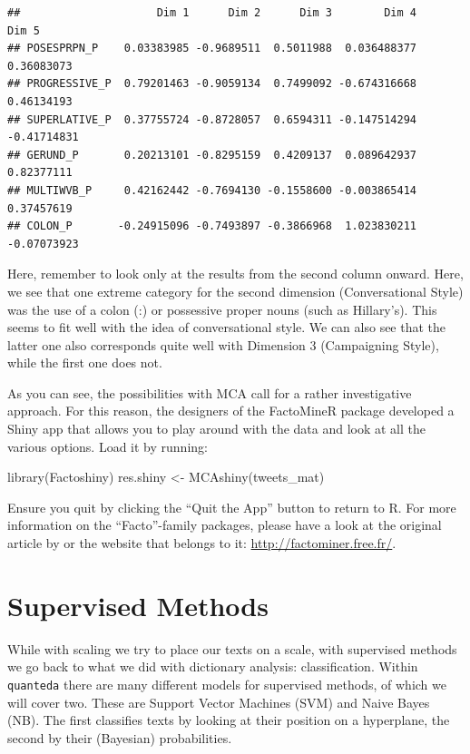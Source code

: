 \documentclass[
]{article}
\newenvironment{Shaded}{\begin{snugshade}}{\end{snugshade}}
\newcommand{\FunctionTok}[1]{\textcolor[rgb]{0.00,0.00,0.00}{#1}}
\newcommand{\NormalTok}[1]{#1}
\newcommand{\OtherTok}[1]{\textcolor[rgb]{0.56,0.35,0.01}{#1}}
\begin{document}
\begin{verbatim}
##                     Dim 1      Dim 2      Dim 3        Dim 4       Dim 5
## POSESPRPN_P    0.03383985 -0.9689511  0.5011988  0.036488377  0.36083073
## PROGRESSIVE_P  0.79201463 -0.9059134  0.7499092 -0.674316668  0.46134193
## SUPERLATIVE_P  0.37755724 -0.8728057  0.6594311 -0.147514294 -0.41714831
## GERUND_P       0.20213101 -0.8295159  0.4209137  0.089642937  0.82377111
## MULTIWVB_P     0.42162442 -0.7694130 -0.1558600 -0.003865414  0.37457619
## COLON_P       -0.24915096 -0.7493897 -0.3866968  1.023830211 -0.07073923
\end{verbatim}

Here, remember to look only at the results from the second column onward. Here, we see that one extreme category for the second dimension (Conversational Style) was the use of a colon (:) or possessive proper nouns (such as Hillary's). This seems to fit well with the idea of conversational style. We can also see that the latter one also corresponds quite well with Dimension 3 (Campaigning Style), while the first one does not.

As you can see, the possibilities with MCA call for a rather investigative approach. For this reason, the designers of the FactoMineR package developed a Shiny app that allows you to play around with the data and look at all the various options. Load it by running:

\begin{Shaded}
\begin{Highlighting}[]
\FunctionTok{library}\NormalTok{(Factoshiny)}
\NormalTok{res.shiny }\OtherTok{\textless{}{-}} \FunctionTok{MCAshiny}\NormalTok{(tweets\_mat)}
\end{Highlighting}
\end{Shaded}

Ensure you quit by clicking the ``Quit the App'' button to return to R. For more information on the ``Facto''-family packages, please have a look at the original article by \textcite{Le2008a} or the website that belongs to it: \url{http://factominer.free.fr/}.

\hypertarget{supervised-methods}{%
\section{Supervised Methods}\label{supervised-methods}}

While with scaling we try to place our texts on a scale, with supervised methods we go back to what we did with dictionary analysis: classification. Within \texttt{quanteda} there are many different models for supervised methods, of which we will cover two. These are Support Vector Machines (SVM) and Naive Bayes (NB). The first classifies texts by looking at their position on a hyperplane, the second by their (Bayesian) probabilities.
\end{document}
